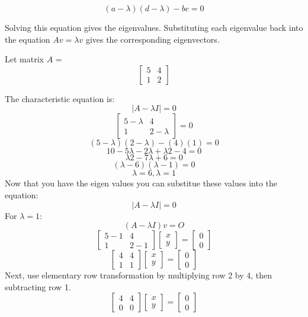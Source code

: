 \begin{equation}
(a - \lambda)(d - \lambda) - bc = 0
\end{equation}

Solving this equation  gives the eigenvalues. Substituting each
eigenvalue back into the equation $Av = \lambda v$ gives the
corresponding eigenvectors.

Let matrix $A$ =
$$\begin{bmatrix}
5 & 4\\
 1 & 2 
\end{bmatrix} $$

The characteristic equation is: 
$$|A - \lambda I| = 0$$ 
$$\begin{bmatrix}
5 - \lambda & 4\\
 1 & 2- \lambda
\end{bmatrix} = 0$$
$$(5 - \lambda) (2 - \lambda) - (4)(1) = 0$$
$$10 - 5\lambda - 2\lambda + \lambda2 - 4 = 0$$
$$\lambda2 - 7\lambda + 6 = 0$$
$$(\lambda - 6)(\lambda - 1) = 0$$
$$\lambda = 6, \lambda = 1$$
Now that you have the eigen values you can substitue these values into the equation: 
$$|A - \lambda I| = 0$$ 
For $λ = 1$:
$$(A - \lambda I) v = O$$
$$\begin{bmatrix}
5-1 & 4 \\
1 & 2-1 
\end{bmatrix}
\begin{bmatrix}
x \\
y 
\end{bmatrix} = 
\begin{bmatrix}
0 \\
0 
\end{bmatrix}$$
$$\begin{bmatrix}
4 & 4\\
1 & 1 
\end{bmatrix}
\begin{bmatrix}
x  \\
y 
\end{bmatrix} = 
\begin{bmatrix}
0  \\
0 
\end{bmatrix}$$
Next, use elementary row transformation by multiplying row 2 by 4, then subtracting row 1.
$$\begin{bmatrix}
4 & 4\\
0 & 0 
\end{bmatrix}
\begin{bmatrix}
x \\
y 
\end{bmatrix} = 
\begin{bmatrix}
0\\
0
\end{bmatrix}$$

